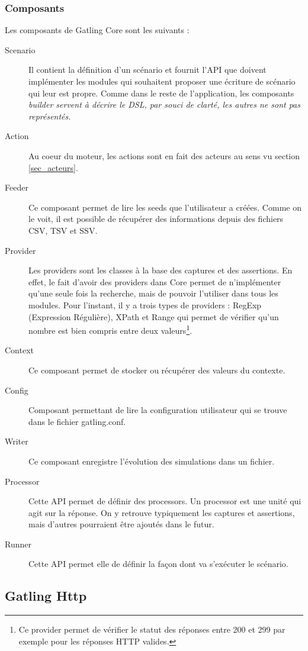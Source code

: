 \subsubsection{Composants}
\label{sec_core_comp}
Les composants de Gatling Core sont les suivants :
\begin{description}
\item[Scenario] Il contient la définition d'un scénario et fournit l'API que doivent implémenter les modules qui souhaitent proposer une écriture de scénario qui leur est propre. Comme dans le reste de l'application, les composants \em{builder} servent à décrire le DSL, par souci de clarté, les autres ne sont pas représentés.
\item[Action] Au coeur du moteur, les actions sont en fait des acteurs au sens vu section \ref{sec_acteurs}.
\item[Feeder] Ce composant permet de lire les seeds que l'utilisateur a créées. Comme on le voit, il est possible de récupérer des informations depuis des fichiers CSV, TSV et SSV.
\item[Provider] Les providers sont les classes à la base des captures et des assertions. En effet, le fait d'avoir des providers dans Core permet de n'implémenter qu'une seule fois la recherche, mais de pouvoir l'utiliser dans tous les modules. Pour l'instant, il y a trois types de providers : RegExp (Expression Régulière), XPath et Range qui permet de vérifier qu'un nombre est bien compris entre deux valeurs\footnote{Ce provider permet de vérifier le statut des réponses entre 200 et 299 par exemple pour les réponses HTTP valides.}.
\item[Context] Ce composant permet de stocker ou récupérer des valeurs du contexte.
\item[Config] Composant permettant de lire la configuration utilisateur qui se trouve dans le fichier gatling.conf.
\item[Writer] Ce composant enregistre l'évolution des simulations dans un fichier.
\item[Processor] Cette API permet de définir des processors. Un processor est une unité qui agit sur la réponse. On y retrouve typiquement les captures et assertions, mais d'autres pourraient être ajoutés dans le futur.
\item[Runner] Cette API permet elle de définir la façon dont va s'exécuter le scénario.
\end{description}

\subsection{Gatling Http}
